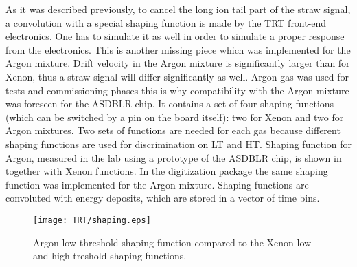 
As it was described previously, to cancel the long ion tail part of the straw signal, a convolution with a special shaping function is made by the TRT front-end electronics.
One has to simulate it as well in order to simulate a proper response from the electronics. 
This is another missing piece which was implemented for the Argon mixture. 
Drift velocity in the Argon mixture is significantly larger than for Xenon, thus a straw signal will differ significantly as well.
Argon gas was used for tests and commissioning phases this is why compatibility with the Argon mixture was foreseen for the ASDBLR chip. It contains a set of four shaping functions (which can be switched
by a pin on the board itself): two for Xenon and two for Argon mixtures. Two sets of functions are needed for each gas because different shaping functions are used for discrimination
on LT and HT. Shaping function for Argon, measured in the lab using a prototype of the ASDBLR chip, is shown in  together with Xenon functions.
In the digitization package the same shaping function was implemented for the Argon mixture. Shaping functions are convoluted with energy deposits, which are stored in a vector of time bins.

\begin{figure}
\begin{center}
 \texttt{[image: TRT/shaping.eps]}
\caption{Argon low threshold shaping function compared to the Xenon low and high treshold shaping functions.}
\label{fig:shaping}
\end{center}
\end{figure}


